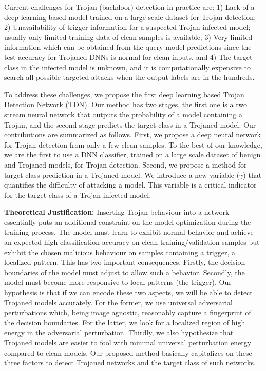 \documentclass{article}
\begin{document}
Current challenges for Trojan (backdoor) detection in practice are: 1) Lack of a deep learning-based model trained on a large-scale dataset for Trojan detection; 2) Unavailability of trigger information for a suspected Trojan infected model; usually only limited training data of clean samples is available;  3) Very limited information which can be obtained from the query model predictions since the test accuracy for Trojaned DNNs is normal for clean inputs, and 4) The target class in the infected model is unknown, and it is computationally expensive to search all possible targeted attacks when the output labels are in the hundreds.



To address these challenges, we propose the first deep learning based Trojan Detection Network (TDN). Our method has two stages, the first one is a two stream neural network that outputs the probability of a model containing a Trojan, and the second stage predicts the target class in a Trojaned model. Our contributions are summarized as follows. First, we propose a deep neural network for Trojan detection from only a few clean samples. To the best of our knowledge, we are the first to use a DNN classifier, trained on a large scale dataset of benign and Trojaned models, for Trojan detection. Second, we propose a method for target class prediction in a Trojaned model. We introduce a new variable ($\gamma$) that quantifies the difficulty of attacking a model. This variable is a critical indicator for the target class of a Trojan infected model.


{\bf Theoretical Justification:} Inserting Trojan behaviour into a network essentially puts an additional constraint on the model optimization during the training process. The model must learn to exhibit normal behavior and achieve an expected high classification accuracy on clean training/validation samples but exhibit the chosen malicious behaviour on samples containing a trigger, a localized pattern. This  has two important consequences. Firstly, the decision boundaries of the model must adjust to allow such a behavior. Secondly, the model must become more responsive to local patterns (the trigger). Our hypothesis is that if we can encode these two aspects, we will be able to detect Trojaned models accurately. For the former, we use universal adversarial perturbations \cite{moosavi2017universal} which, being image agnostic, reasonably capture a fingerprint of the decision boundaries. For the latter, we look for a localized region of high energy in the adversarial perturbation. Thirdly, we also hypothesize that Trojaned models are easier to fool with minimal universal perturbation energy compared to clean models. Our proposed method basically capitalizes on these three factors to detect Trojaned networks and the target class of such networks. 
\end{document}
